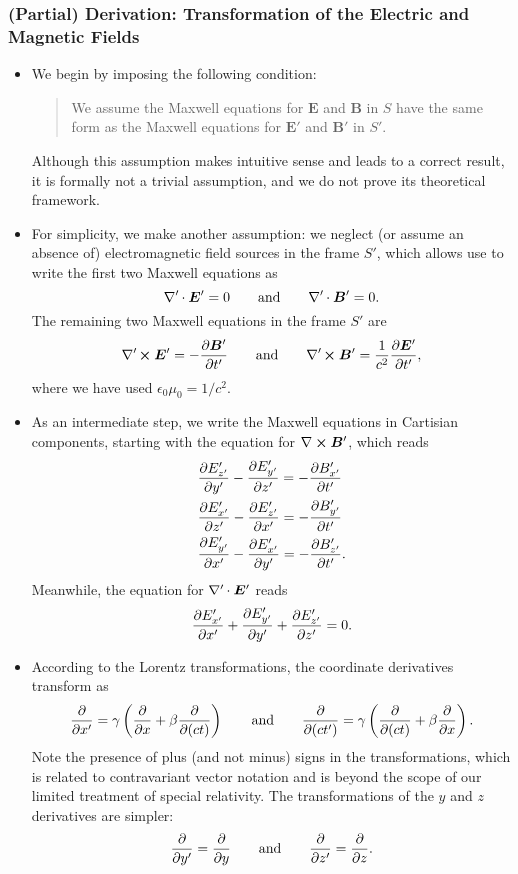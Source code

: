 \documentclass[11pt, a4paper]{article}
\newcommand{\eqtext}[1]{\qquad \text{#1} \qquad}
\renewcommand{\vec}[1]{\bm{#1}} %
\newcommand{\E}{\vec{E}} %
\newcommand{\B}{\vec{B}} %
\newcommand{\ee}{\epsilon_{0}}  %
\newcommand{\mm}{\mu_{0}}  %
\renewcommand{\curl}{\nabla \cross}
\newcommand{\divp}{\nabla' \mspace{-1mu} \cdot}  %
\newcommand{\curlp}{\nabla' \mspace{-2mu} \cross}
\begin{document}
\subsubsection{(Partial) Derivation: Transformation of the Electric and Magnetic Fields}
\begin{itemize}
	\item We begin by imposing the following condition:
    \begin{quote}
        We assume the Maxwell equations for $ \E $ and $ \B $ in $ S $ have the same form as the Maxwell equations for $ \E' $ and $ \B' $ in $ S' $.
    \end{quote}
    Although this assumption makes intuitive sense and leads to a correct result, it is formally not a trivial assumption, and we do not prove its theoretical framework.
	
    \item For simplicity, we make another assumption: we neglect (or assume an absence of) electromagnetic field sources in the frame $ S' $, which allows use to write the first two Maxwell equations as
    \begin{equation*}
        \divp \E' = 0 \qquad \text{and} \qquad \divp \B' = 0.
    \end{equation*}
    The remaining two Maxwell equations in the frame $ S' $ are
	\begin{equation*}
		\curlp \E' = - \pdv{\B'}{t'}  \eqtext{and} \curlp \B' = \frac{1}{c^{2}}\pdv{\E'}{t'},
	\end{equation*}
    where we have used $ \ee \mm = 1 / c^{2} $. 

    \item As an intermediate step, we write the Maxwell equations in Cartisian components, starting with the equation for $ \curl \B' $, which reads
	\begin{align*}
		& \pdv{E'_{z'}}{y'} - \pdv{E'_{y'}}{z'} = - \pdv{B'_{x'}}{t'} \\ 
		&\pdv{E'_{x'}}{z'} - \pdv{E'_{z'}}{x'} = - \pdv{B'_{y'}}{t'}\\
		&\pdv{E'_{y'}}{x'} - \pdv{E'_{x'}}{y'} = - \pdv{B'_{z'}}{t'}.
	\end{align*}
    Meanwhile, the equation for $ \divp \E' $ reads
	\begin{equation*}
		\pdv{E'_{x'}}{x'} + 	\pdv{E'_{y'}}{y'} + 	\pdv{E'_{z'}}{z'} = 0.
	\end{equation*}
    
    \item According to the Lorentz transformations, the coordinate derivatives transform as
	\begin{equation*}
		\pdv{x'}  = \gamma \left(\pdv{x} + \beta \pdv{(ct)}\right) \eqtext{and} \pdv{(ct')} = \gamma \left(\pdv{(ct)} + \beta \pdv{x}\right).
	\end{equation*}
    Note the presence of plus (and not minus) signs in the transformations, which is related to contravariant vector notation and is beyond the scope of our limited treatment of special relativity. The transformations of the $ y $ and $ z $ derivatives are simpler:
	\begin{equation*}
		\pdv{y'} = \pdv{y} \eqtext{and} \pdv{z'} = \pdv{z}.
	\end{equation*}
    

\end{itemize}
\end{document}
